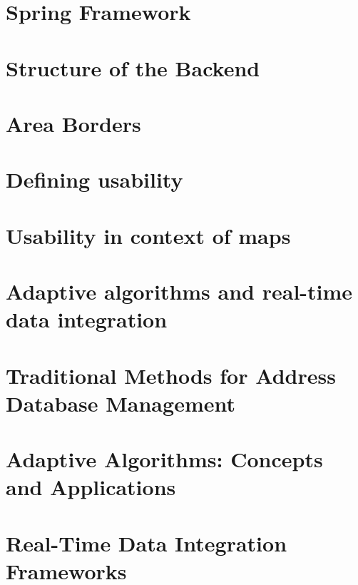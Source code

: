 \section{Spring Framework}


\section{Structure of the Backend}


\section{Area Borders}


\section{Defining usability}


\section{Usability in context of maps}


\section{Adaptive algorithms and real-time data integration}


\section{Traditional Methods for Address Database Management}


\section{Adaptive Algorithms: Concepts and Applications}


\section{Real-Time Data Integration Frameworks}
